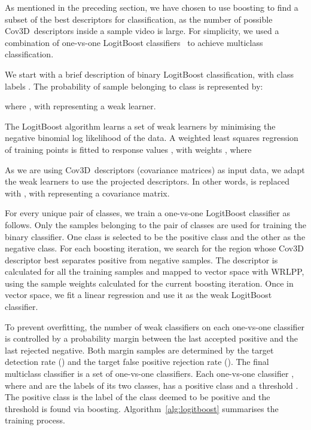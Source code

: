 \documentclass[10pt,twocolumn,letterpaper]{article}
\newcommand{\alg}[1]{\mbox{Algorithm~\ref{#1}}}
\newcommand{\eqsize}{\footnotesize}
\newcommand{\cov}{{Cov3D}}
\newcommand{\wrlpp}{WRLPP}
\begin{document}
As mentioned in the preceding section,
we have chosen to use boosting to find a subset of the best descriptors for classification,
as the number of possible \cov~descriptors inside a sample video is large.
For simplicity, we used a combination of one-vs-one LogitBoost classifiers~\cite{FriedmanEtAl2000}
to achieve multiclass classification.

We start with a brief description of binary LogitBoost classification, with class labels {\eqsize }.
The probability of sample {\eqsize } belonging to class {\eqsize } is represented by:

\vspace{-1ex}
\eqsize

\normalsize

\noindent
where {\eqsize },
with {\eqsize } representing a weak learner.

The LogitBoost algorithm learns a set of {\eqsize } weak learners
by minimising the negative binomial log likelihood of the data.
A weighted least squares regression {\eqsize } of training points {\eqsize } is fitted to response values {\eqsize }, with weights {\eqsize },
where

\noindent
\eqsize

\normalsize

As we are using \cov~descriptors (covariance matrices) as input data,
we adapt the weak learners {\eqsize } to use the projected descriptors.
In other words, {\eqsize } is replaced with {\eqsize },
with {\eqsize } representing a covariance matrix.


For every unique pair of classes, we train a one-vs-one LogitBoost classifier as follows.
Only the samples belonging to the pair of classes are used for training the binary classifier.
One class is selected to be the positive class and the other as the negative class.
For each boosting iteration, we search for the region whose {\cov} descriptor best separates positive from negative samples. The descriptor is
calculated for all the training samples and mapped to vector space with \wrlpp, using the sample weights calculated for the current boosting
iteration. Once in vector space, we fit a linear regression and use it as the weak LogitBoost classifier.

To prevent overfitting, the number of weak classifiers on each one-vs-one classifier
is controlled by a probability margin between the last accepted positive and the last rejected negative.
Both margin samples are determined by the target detection rate ({\eqsize }) and the target false positive rejection rate ({\eqsize }).
The final multiclass classifier is a set of one-vs-one classifiers.
Each one-vs-one classifier {\eqsize }, where {\eqsize } and {\eqsize } are the labels of its two classes, has a positive class
{\eqsize } and a threshold {\eqsize }. The positive class is the label of the class deemed to be positive and the threshold
is found via boosting.
\alg{alg:logitboost} summarises the training process.
\end{document}

